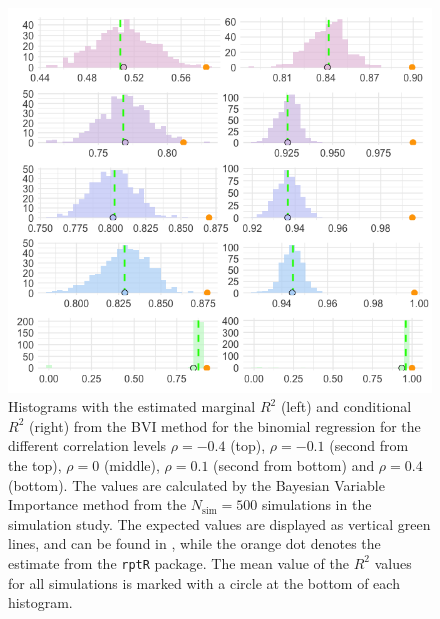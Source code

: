 \begin{figure}[H]
  \centering
  \includegraphics[width=1.1\linewidth]{Figures/Simulation study/R2_combined_poisson_test.png}
  \caption{Histograms with the estimated marginal $R^2$ (left) and conditional $R^2$ (right) from the BVI method for the binomial regression for the different correlation levels $\rho=-0.4$ (top), $\rho=-0.1$ (second from the top), $\rho=0$ (middle), $\rho=0.1$ (second from bottom) and $\rho=0.4$ (bottom). The values are calculated by the Bayesian Variable Importance method from the $N_{\text{sim}}=500$ simulations in the simulation study. The expected values are displayed as vertical green lines, and can be found in , while the orange dot denotes the estimate from the \texttt{rptR} package. The mean value of the $R^2$ values for all simulations is marked with a circle at the bottom of each histogram.}
  \label{fig:r2_combined_poisson}
\end{figure}



